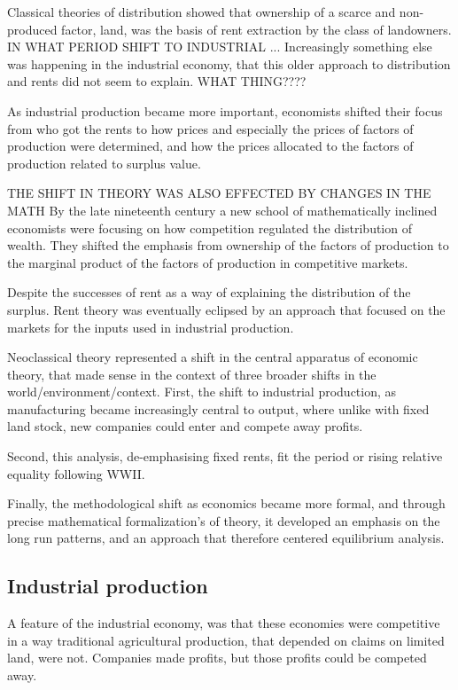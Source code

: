 Classical theories of distribution showed that ownership of a scarce and non-produced factor, land, was the basis of rent extraction by the class of landowners. IN WHAT PERIOD SHIFT TO INDUSTRIAL ... Increasingly something else was happening in the industrial economy, that this older approach to distribution and rents did not seem to explain. WHAT THING????
 
 As industrial production became more important, economists shifted their focus from who got the rents to how prices and especially the prices of factors of production were determined, and how the prices allocated to the factors of production related to surplus value.

THE SHIFT IN THEORY WAS ALSO EFFECTED BY CHANGES IN THE MATH
 By the late nineteenth  century a new school of mathematically inclined economists were focusing on how competition regulated the distribution of wealth. They shifted the emphasis from ownership of the factors of production to the marginal product of the factors of production in \gls{competitive} markets.


 
Despite the successes of rent as a way of explaining the distribution of the surplus. %
Rent theory was eventually eclipsed by an approach that focused on the markets for the inputs used in industrial production. %

Neoclassical theory represented a shift in the central apparatus of economic theory, that made sense in the context of three broader shifts in the world/environment/context. First, the shift to industrial production, as manufacturing became increasingly central to output, where unlike with fixed land stock, new companies could enter and compete away profits. 


Second, this analysis, de-emphasising fixed rents, fit the period or rising relative equality  following WWII.


Finally, the methodological shift as economics became more formal, and through precise mathematical formalization's of theory, it developed an emphasis on the long run patterns, and an approach that therefore centered equilibrium analysis. 




\subsection{Industrial production}
A feature of the industrial economy, was that these economies were competitive in a way traditional agricultural production, that depended on claims on limited land, were not. 
Companies made profits, but those profits could be competed away. 

